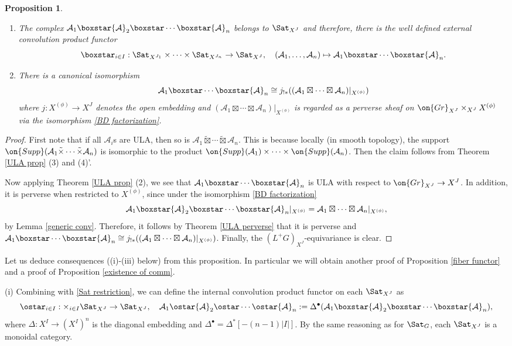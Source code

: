 \documentclass[]{pcmi}
\theoremstyle{plain}
\newtheorem{prop}[equation]{Proposition}
\theoremstyle{remark}
\theoremstyle{definition}
\newcommand{\mA}{{\mathcal A}}
\newcommand{\Gr}{{\on{Gr}}}
\begin{document}
\begin{prop}\label{conv=fusion}~
\begin{enumerate}
\item The complex $\mA_1\boxstar\mA_2\boxstar\cdots\boxstar\mA_n$ belongs to $\Sat_{X^{J}}$ and therefore, there is the well defined external convolution product functor
\[\boxstar_{i\in I}:\Sat_{X^{J_1}}\times\cdots\times\Sat_{X^{J_n}}\to \Sat_{X^J},\quad (\mA_1,\ldots,\mA_n)\mapsto \mA_1\boxstar\cdots\boxstar\mA_n.\]

\item There is a canonical isomorphism
\begin{equation}\label{eqfusion}
\mA_1\boxstar\cdots\boxstar\mA_n\cong j_{!*}((\mA_1\boxtimes\cdots\boxtimes\mA_n)|_{X^{(\phi)}})
\end{equation}
where $j: X^{(\phi)}\to X^J$ denotes the open embedding and $(\mA_1\boxtimes\cdots\boxtimes\mA_n)|_{X^{(\phi)}}$ is regarded as a perverse sheaf on $\Gr_{X^J}\times_{X^J}X^{(\phi)}$ via the isomorphism \eqref{BD factorization}.
\end{enumerate}
\end{prop}
\begin{proof}First note that if all $\mA_i$s are ULA, then so is $\mA_1\tilde\boxtimes\cdots\tilde\boxtimes\mA_n$. This is because
locally (in smooth topology), the support $\on{Supp}(\mA_1\tilde\times\cdots\tilde\times\mA_n)$ is isomorphic to the product $\on{Supp}(\mA_1)\times\cdots\times\on{Supp}(\mA_n)$. Then the claim follows from Theorem \ref{ULA prop} (3) and (4)'.

Now applying Theorem \ref{ULA prop} (2), we see that $\mA_1\boxstar\cdots\boxstar\mA_n$ is ULA with respect to $\Gr_{X^J}\to X^J$. In addition, it is perverse when restricted to $X^{(\phi)}$, since under the isomorphism \eqref{BD factorization} 
\[\mA_1\boxstar \mA_2\boxstar \cdots\boxstar \mA_n|_{X^{(\phi)}}=\mA_1\boxtimes\cdots\boxtimes\mA_n|_{X^{(\phi)}},\]
by Lemma \ref{generic conv}. 
Therefore, it follows by Theorem \ref{ULA perverse} that it is perverse and  $\mA_1\boxstar\cdots\boxstar\mA_n\cong j_{!*}((\mA_1\boxtimes\cdots\boxtimes\mA_n)|_{X^{(\phi)}})$.
Finally, the $(L^+G)_{X^J}$-equivariance is clear.
\end{proof}

Let us deduce consequences ((i)-(iii) below) from this proposition. In particular we will obtain another proof of Proposition \ref{fiber functor} and a proof of Proposition \ref{existence of comm}.

(i) Combining with \eqref{Sat restriction}, we can define the internal convolution product functor on each $\Sat_{X^J}$ as
\begin{equation}\label{internal convolution}
\ostar_{i\in I}: \times_{i\in I}\Sat_{X^J}\to \Sat_{X^J},\quad \mA_1\ostar\mA_2\ostar\cdots\ostar\mA_n:= \Delta^\bullet(\mA_1\boxstar\mA_2\boxstar\cdots\boxstar\mA_n),
\end{equation}
where $\Delta: X^I\to (X^I)^n$ is the diagonal embedding and $\Delta^\bullet=\Delta^*[-(n-1)|I|]$. By the same reasoning as for $\Sat_G$, each $\Sat_{X^J}$ is a monoidal category.
\end{document}
